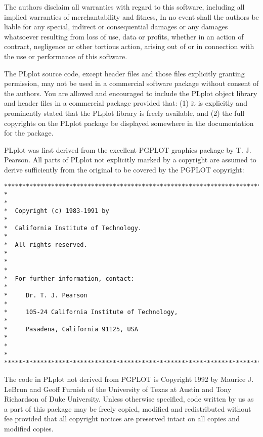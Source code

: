 The authors disclaim all warranties with regard to this software,
including all implied warranties of merchantability and fitness, In no
event shall the authors be liable for any special, indirect or
consequential damages or any damages whatsoever resulting from loss of
use, data or profits, whether in an action of contract, negligence or
other tortious action, arising out of or in connection with the use or
performance of this software.

The PLplot source code, except header files and those files explicitly
granting permission, may not be used in a commercial software package
without consent of the authors.  You are allowed and encouraged to
include the PLplot object library and header files in a commercial
package provided that: (1) it is explicitly and prominently stated
that the PLplot library is freely available, and (2) the full
copyrights on the PLplot package be displayed somewhere in the
documentation for the package.

PLplot was first derived from the excellent PGPLOT graphics package by
T.  J. Pearson.  All parts of PLplot not explicitly marked by a
copyright are assumed to derive sufficiently from the original to be
covered by the PGPLOT copyright:
\begin{verbatim}
***********************************************************************
*                                                                     *
*  Copyright (c) 1983-1991 by                                         *
*  California Institute of Technology.                                *
*  All rights reserved.                                               *
*                                                                     *
*  For further information, contact:                                  *
*     Dr. T. J. Pearson                                               *
*     105-24 California Institute of Technology,                      *
*     Pasadena, California 91125, USA                                 *
*                                                                     *
***********************************************************************
\end{verbatim}

The code in PLplot not derived from PGPLOT is Copyright 1992 by
Maurice J.  LeBrun and Geoff Furnish of the University of Texas at
Austin and Tony Richardson of Duke University.  Unless otherwise
specified, code written by us as a part of this package may be freely
copied, modified and redistributed without fee provided that all
copyright notices are preserved intact on all copies and modified
copies.

